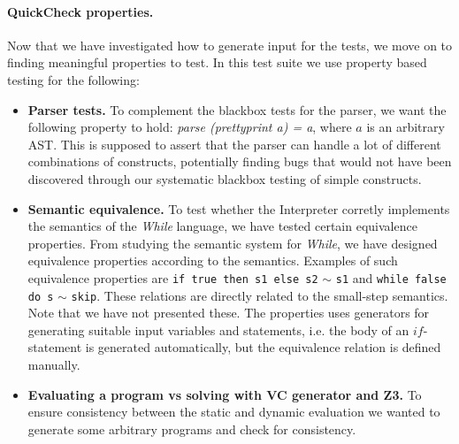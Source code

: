 \paragraph{QuickCheck properties.}
Now that we have investigated how to generate input for the tests, we move on to finding meaningful properties to test. In this test suite we use property based testing for the following:
\begin{itemize}
  \item \textbf{Parser tests.}
  To complement the blackbox tests for the parser, we want the following property to hold: \textit{parse (prettyprint a) = a}, where $a$ is an arbitrary AST. This is supposed to assert that the parser can handle a lot of different combinations of constructs, potentially finding bugs that would not have been discovered through our systematic blackbox testing of simple constructs.
	\item \textbf{Semantic equivalence.}
  To test whether the Interpreter corretly implements the semantics of the \textit{While} language, we have tested certain equivalence properties. From studying the semantic system for \textit{While}, we have designed equivalence properties according to the semantics.
	Examples of such equivalence properties are \texttt{if true then s1 else s2} $\sim$ \texttt{s1} and \texttt{while false do s} $\sim$ \texttt{skip}.
  These relations are directly related to the small-step semantics. Note that we have not presented these. The properties uses generators for generating suitable input variables and statements, i.e. the body of an $if$-statement is generated automatically, but the equivalence relation is defined manually.
	\item \textbf{Evaluating a program vs solving with VC generator and Z3.}
    To ensure consistency between the static and dynamic evaluation we wanted to generate some arbitrary programs and check for consistency.

\end{itemize}
